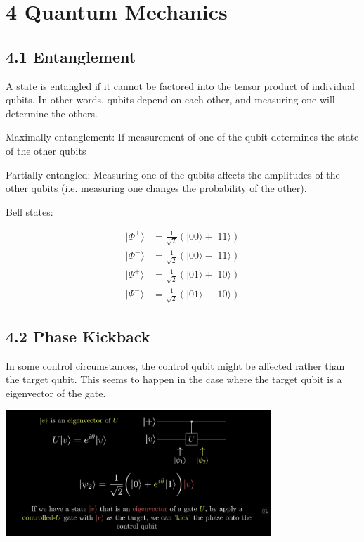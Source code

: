 \documentclass[10pt,oneside,a4paper]{article}
\begin{document}
\section*{4 Quantum Mechanics}

\subsection*{4.1 Entanglement}

A state is entangled if it cannot be factored into the tensor product of individual qubits. In other words, qubits depend on each other, and measuring one will determine the others.

Maximally entanglement: If measurement of one of the qubit determines the state of the other qubits

Partially entangled: Measuring one of the qubits affects the amplitudes of the other qubits (i.e. measuring one changes the probability of the other). 

Bell states: 

\[
\begin{aligned}
|\Phi^+ \rangle &= \frac{1}{\sqrt{2}} \left( |00\rangle + |11\rangle \right) \\
|\Phi^- \rangle &= \frac{1}{\sqrt{2}} \left( |00\rangle - |11\rangle \right) \\
|\Psi^+ \rangle &= \frac{1}{\sqrt{2}} \left( |01\rangle + |10\rangle \right) \\
|\Psi^- \rangle &= \frac{1}{\sqrt{2}} \left( |01\rangle - |10\rangle \right)
\end{aligned}
\]

\subsection*{4.2 Phase Kickback}

In some control circumstances, the control qubit might be affected rather than the target qubit. This seems to happen in the case where the target qubit is a eigenvector of the gate. 

\begin{center}
\includegraphics[width=10cm]{6}
\end{center}
\end{document}
